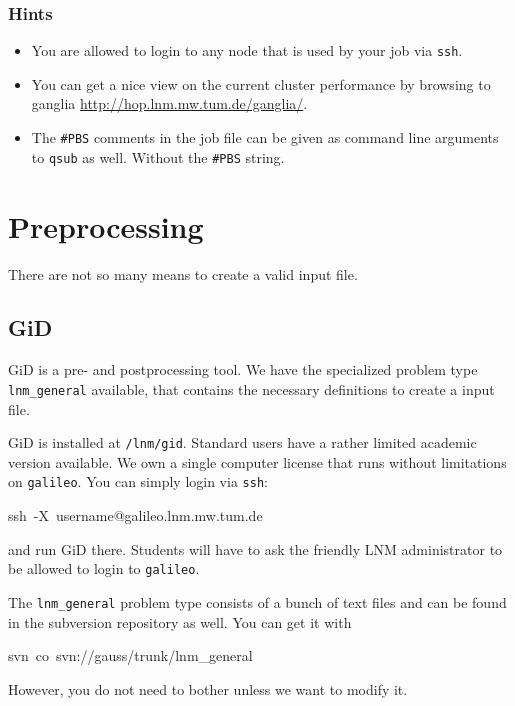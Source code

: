 \subsubsection{Hints}

\begin{itemize}
\item You are allowed to login to any node that is used by your job via
\texttt{ssh}.
\item You can get a nice view on the current cluster performance by browsing
to ganglia \url{http://hop.lnm.mw.tum.de/ganglia/}.
\item The \texttt{\#PBS} comments in the job file can be given as command
line arguments to \texttt{qsub} as well. Without the \texttt{\#PBS}
string.
\end{itemize}

\section{Preprocessing}

There are not so many means to create a valid input file.


\subsection{GiD}

GiD is a pre- and postprocessing tool. We have the specialized problem
type \texttt{lnm\_general} available, that contains the necessary
definitions to create a \ccarat{} input file. 

GiD is installed at \texttt{/lnm/gid}. Standard users have a rather
limited academic version available. We own a single computer license
that runs without limitations on \texttt{galileo}. You can simply
login via \texttt{ssh}:

\begin{lyxcode}
ssh~-X~username@galileo.lnm.mw.tum.de
\end{lyxcode}
and run GiD there. Students will have to ask the friendly LNM administrator
to be allowed to login to \texttt{galileo}.

The \texttt{lnm\_general} problem type consists of a bunch of text
files and can be found in the subversion repository as well. You can
get it with

\begin{lyxcode}
svn~co~svn://gauss/trunk/lnm\_general
\end{lyxcode}
However, you do not need to bother unless we want to modify it.


